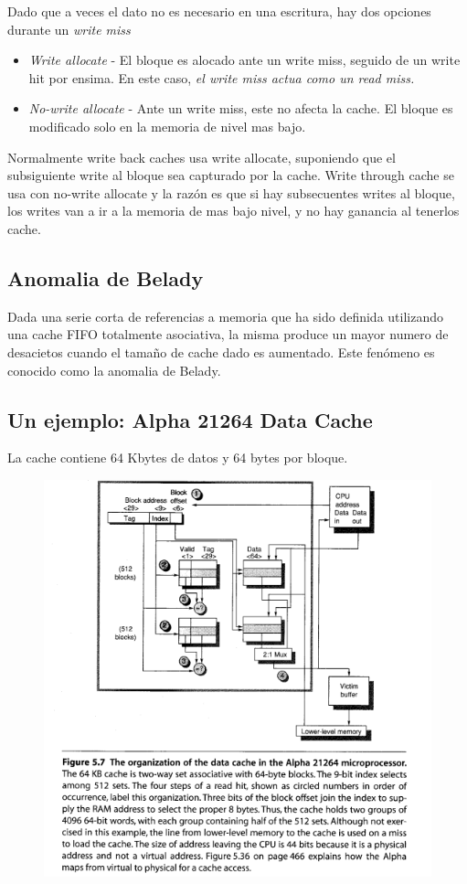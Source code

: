 \documentclass{article}
\begin{document}
Dado que a veces el dato no es necesario en una escritura, hay dos opciones durante un \textit{write miss}

\begin{itemize} 
    \item \textit{Write allocate} - El bloque es alocado ante un write miss, seguido de un write hit por ensima. En este caso, \textit{el write miss actua como un read miss.}
    \item \textit{No-write allocate} - Ante un write miss, este no afecta la cache. El bloque es modificado solo en la memoria de nivel mas bajo.
\end{itemize}

Normalmente write back caches usa write allocate, suponiendo que el subsiguiente write al bloque sea capturado por la cache.
Write through cache se usa con no-write allocate y la razón es que si hay subsecuentes writes al bloque, los writes van a ir a la memoria de mas bajo nivel, y no hay ganancia al tenerlos cache. 

\subsection{Anomalia de Belady}
Dada una serie corta de referencias a memoria que ha sido definida utilizando una cache FIFO totalmente asociativa, la misma produce un mayor numero de desacietos cuando el tamaño de cache dado es aumentado. Este fenómeno es conocido como la anomalia de Belady.

\subsection{Un ejemplo: Alpha 21264 Data Cache}

La cache contiene 64 Kbytes de datos y 64 bytes por bloque.

\begin{figure}[h!]
    \includegraphics[width=\linewidth]{imagenes/Cache2WayAssosiativeAlpha.png}
\end{figure}
\end{document}
